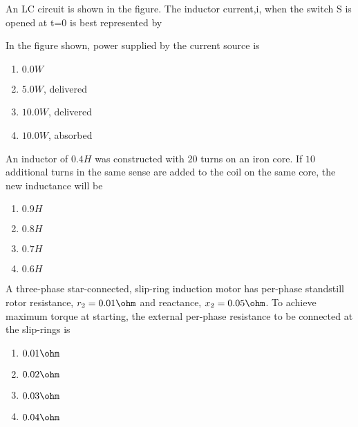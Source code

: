 \iffalse
\chapter{2008}
\author{EE24BTECH11058}
\section{xe}
\fi
 
    \item An LC circuit is shown in the figure. The inductor current,i, when the switch S is opened at t=0 is best represented by\\
    
     
           

    \item In the figure shown, power supplied by the current source is 
      
    \begin{enumerate}
        \item $0.0 W$
        \item $5.0 W$, delivered
        \item $10.0 W$, delivered
        \item $10.0 W$, absorbed \\
    \end{enumerate}


    \item An inductor of $0.4 H$ was constructed with $20$ turns on an iron core. If $10$ additional turns in the same sense are added to the coil on the same core, the new inductance will be
    \begin{enumerate}
        \item $0.9 H$
        \item $0.8 H$
        \item $0.7 H$
        \item $0.6 H$ \\
    \end{enumerate}


    \item A three-phase star-connected, slip-ring induction motor has per-phase standstill rotor resistance, $r_{2} = 0.01 \ohm$ and reactance, $x_{2} = 0.05 \ohm$. To achieve maximum torque at starting, the external per-phase resistance to be connected at the slip-rings is 
    \begin{enumerate}
        \item $ 0.01 \ohm$
        \item $ 0.02 \ohm$
        \item $ 0.03 \ohm$
        \item $ 0.04 \ohm$ \\
    \end{enumerate}

